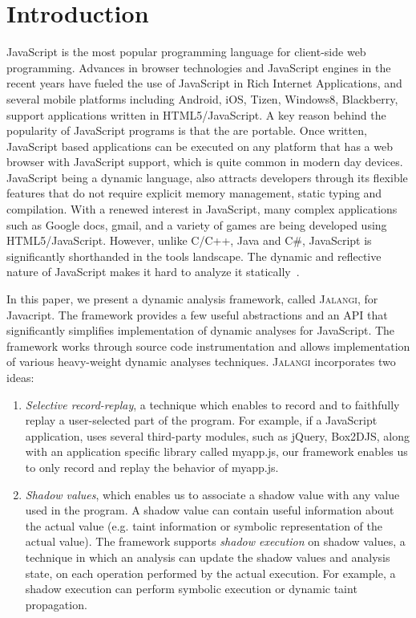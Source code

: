 \documentclass{sig-alternate}
\def\jalangi{\textsc{Jalangi}}
\begin{document}
\section{Introduction}

JavaScript is the most popular programming language for client-side
web programming. Advances in browser technologies and JavaScript
engines in the recent years have fueled the use of JavaScript in Rich
Internet Applications, and several mobile platforms including Android,
iOS, Tizen, Windows8, Blackberry, support applications written in
HTML5/JavaScript. A key reason behind the popularity of JavaScript
programs is that the are portable. Once written, JavaScript based
applications can be executed on any platform that has a web browser
with JavaScript support, which is quite common in modern day devices.
JavaScript being a dynamic language, also attracts developers through
its flexible features that do not require explicit memory management,
static typing and compilation.  With a renewed interest in JavaScript,
many complex applications such as Google docs, gmail, and a variety of
games are being developed using HTML5/JavaScript. However, unlike
C/C++, Java and C\#, JavaScript is significantly shorthanded in the
tools landscape. The dynamic and reflective nature of JavaScript makes
it hard to analyze it
statically~\cite{Richards:2010:ADB:1806596.1806598,Wei:2012:BAJ:2384716.2384758,Ratanaworabhan:2010:JCB:1863166.1863169}.

In this paper, we present a dynamic analysis framework, called
\jalangi{}, for Javacript.  The framework provides a few useful
abstractions and an API that significantly simplifies implementation
of dynamic analyses for JavaScript.  The framework works through
source code instrumentation and allows implementation of various
heavy-weight dynamic analyses techniques.  \jalangi{} incorporates two
ideas:

\begin{enumerate}
\item \emph{Selective record-replay}, a technique which enables to record and
  to faithfully replay a user-selected part of the program.  For
  example, if a JavaScript application, uses several third-party
  modules, such as jQuery, Box2DJS, along with an application specific
  library called myapp.js, our framework enables us to only record and
  replay the behavior of myapp.js.
\item\emph{ Shadow values}, which enables us to associate a shadow
  value with any value used in the program.  A shadow value can
  contain useful information about the actual value (e.g. taint
  information or symbolic representation of the actual value).  The
  framework supports \emph{shadow execution} on shadow values, a
  technique in which an analysis can update the shadow values and
  analysis state, on each operation performed by the actual execution.
  For example, a shadow execution can perform symbolic execution or
  dynamic taint propagation.
\end{enumerate}
\end{document}

